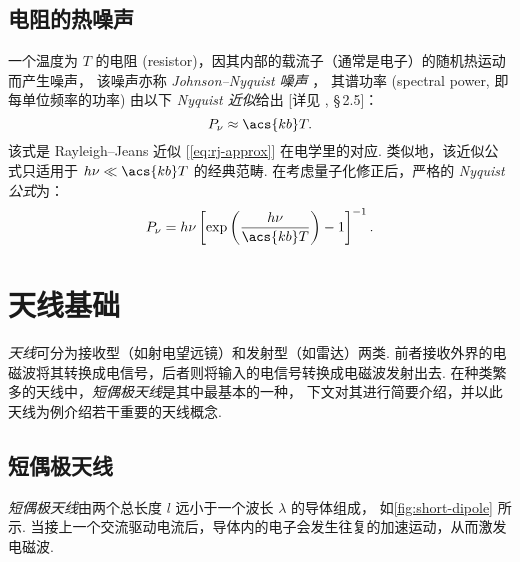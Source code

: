 \subsection{电阻的热噪声}

一个温度为 $T$ 的电阻 (resistor)，因其内部的载流子（通常是电子）的随机热运动而产生噪声，
该噪声亦称 \emph{Johnson--Nyquist 噪声} \cite{johnson1928,nyquist1928}，
其谱功率 (spectral power, 即每单位频率的功率) 由以下 \emph{Nyquist 近似}给出
[详见 , \S\,2.5]：
\begin{equation}
  \label{eq:nyquist-approx}
  P_{\nu} \approx \acs{kb} T .
\end{equation}
该式是 Rayleigh--Jeans 近似 [\autoref{eq:rj-approx}] 在电学里的对应.
类似地，该近似公式只适用于 $h\nu \ll \acs{kb}T$ 的经典范畴.
在考虑量子化修正后，严格的 \emph{Nyquist 公式}为：
\begin{equation}
  \label{eq:nyquist}
  P_{\nu} = h \nu
    \left[ \exp\left( \frac{h \nu}{\acs{kb} T} \right) - 1 \right]^{-1} .
\end{equation}


\section{天线基础}
\label{sec:antenna}

\emph{天线}可分为接收型（如射电望远镜）和发射型（如雷达）两类.
前者接收外界的电磁波将其转换成电信号，后者则将输入的电信号转换成电磁波发射出去.
在种类繁多的天线中，\emph{短偶极天线}是其中最基本的一种，
下文对其进行简要介绍，并以此天线为例介绍若干重要的天线概念.

\subsection{短偶极天线}

\emph{短偶极天线}由两个总长度 $l$ 远小于一个波长 $\lambda$ 的导体组成，
如\autoref{fig:short-dipole} 所示.
当接上一个交流驱动电流后，导体内的电子会发生往复的加速运动，从而激发电磁波.

